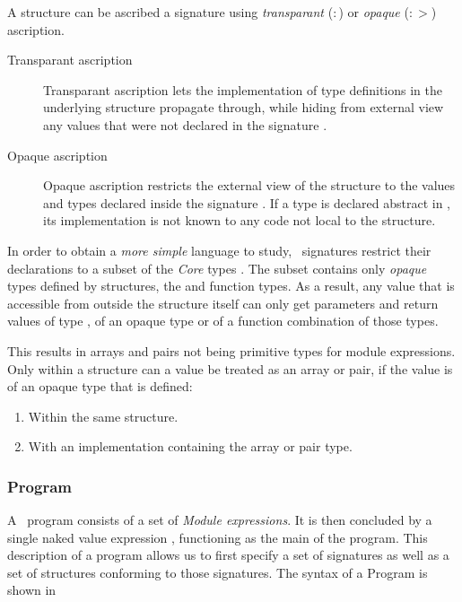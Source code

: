 A structure can be ascribed a signature using \emph{transparant} ($:$) or \emph{opaque} ($:>$) ascription.
\begin{description}
\item[Transparant ascription] Transparant ascription  lets the implementation of type definitions in the underlying structure  propagate through, while hiding from external view any values that were not declared in the signature .
\item[Opaque ascription] Opaque ascription  restricts the external view of the structure to the values and types declared inside the signature .
If a type  is declared abstract in , its implementation is not known to any code not local to the structure.
\end{description}

In order to obtain a \emph{more simple} language to study, \MiniML\ signatures restrict their declarations to a subset  of the \emph{Core} types \cmath{\tau}. 
The subset  contains only \emph{opaque} types defined by structures, the  and function types.
As a result, any value that is accessible from outside the structure itself can only get parameters and return values of type , of an opaque type or of a function combination of those types.

This results in arrays \cmath{[\tau]} and pairs  not being primitive types for module expressions.
Only within a structure can a value be treated as an array or pair, if the value is of an opaque type that is defined:
\begin{enumerate}
\item Within the same structure.
\item With an implementation containing the array or pair type.
\end{enumerate}



\subsubsection{Program}
A \MiniML\ program consists of a set of \emph{Module expressions}.
It is then concluded by a single naked value expression , functioning as the main of the program.
This description of a program allows us to first specify a set of signatures as well as a set of structures conforming to those signatures.
The syntax of a Program is shown in 

